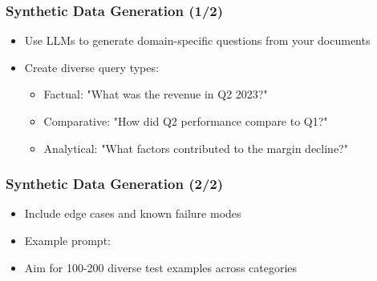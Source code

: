 
\begin{frame}
    \frametitle{Synthetic Data Generation (1/2)}
    \begin{itemize}
        \item Use LLMs to generate domain-specific questions from your documents
        \item Create diverse query types:
        \begin{itemize}
            \item Factual: "What was the revenue in Q2 2023?"
            \item Comparative: "How did Q2 performance compare to Q1?"
            \item Analytical: "What factors contributed to the margin decline?"
        \end{itemize}
    \end{itemize}
    
    \vspace{0.3cm}
    \begin{center}
    \end{center}
\end{frame}

\begin{frame}
    \frametitle{Synthetic Data Generation (2/2)}
    \begin{itemize}
        \item Include edge cases and known failure modes
        \item Example prompt: 
    \end{itemize}
    
    \begin{center}
    \end{center}
    
    \vspace{0.3cm}
    \begin{itemize}
        \item Aim for 100-200 diverse test examples across categories
    \end{itemize}
\end{frame}

